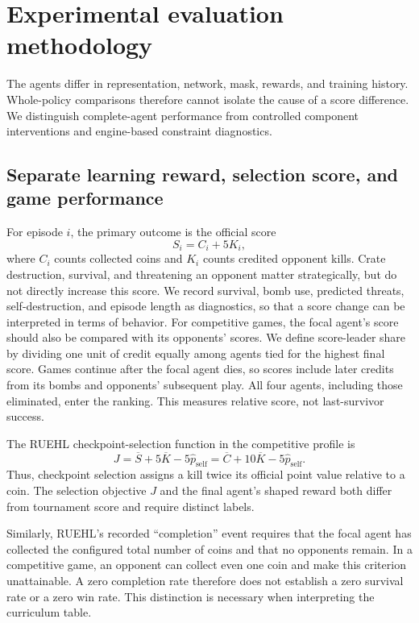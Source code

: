 \section{Experimental evaluation methodology}
\label{sec:jesper-evaluation}

The agents differ in representation, network, mask, rewards, and training
history. Whole-policy comparisons therefore cannot isolate the cause of a
score difference. We distinguish complete-agent performance from controlled
component interventions and engine-based constraint diagnostics.

\subsection{Separate learning reward, selection score, and game performance}
For episode $i$, the primary outcome is the official score
\[
S_i=C_i+5K_i,
\]
where $C_i$ counts collected coins and $K_i$ counts credited opponent kills.
Crate destruction, survival, and threatening an opponent matter strategically,
but do not directly increase this score. We record survival, bomb use,
predicted threats, self-destruction, and episode length as diagnostics, so that a
score change can be interpreted in terms of behavior. For competitive games,
the focal agent's score should also be compared with its opponents' scores.
We define score-leader share by dividing one unit of credit equally among
agents tied for the highest final score. Games continue after the focal
agent dies, so scores include later credits from its bombs and opponents'
subsequent play. All four agents, including those eliminated, enter the
ranking. This measures relative score, not last-survivor success.

The RUEHL checkpoint-selection function in the competitive profile is
\[
J=\overline{S}+5\overline{K}-5\widehat{p}_{\mathrm{self}}
 =\overline{C}+10\overline{K}-5\widehat{p}_{\mathrm{self}}.
\]
Thus, checkpoint selection assigns a kill twice its official point value
relative to a coin. The selection objective $J$ and the final agent's shaped reward both differ
from tournament score and require distinct labels.

Similarly, RUEHL's recorded ``completion'' event requires that the focal
agent has collected the configured total number of coins and that no
opponents remain. In a competitive game, an opponent can collect even one
coin and make this criterion unattainable. A zero completion rate therefore
does not establish a zero survival rate or a zero win rate. This distinction
is necessary when interpreting the curriculum table.

